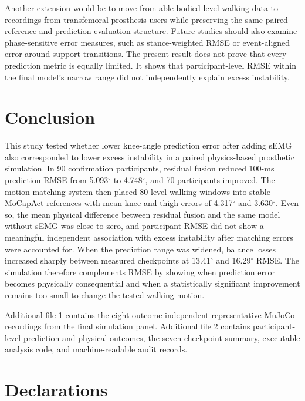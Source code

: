 \documentclass[referee,lineno,pdflatex,sn-vancouver-num]{sn-jnl}
\begin{document}
Another extension would be to move from able-bodied level-walking data to recordings from transfemoral prosthesis users while preserving the same paired reference and prediction evaluation structure. Future studies should also examine phase-sensitive error measures, such as stance-weighted RMSE or event-aligned error around support transitions. The present result does not prove that every prediction metric is equally limited. It shows that participant-level RMSE within the final model's narrow range did not independently explain excess instability.

\section{Conclusion}\label{sec:conclusion}

This study tested whether lower knee-angle prediction error after adding sEMG also corresponded to lower excess instability in a paired physics-based prosthetic simulation. In 90 confirmation participants, residual fusion reduced 100-ms prediction RMSE from 5.093$^{\circ}$ to 4.748$^{\circ}$, and 70 participants improved. The motion-matching system then placed 80 level-walking windows into stable MoCapAct references with mean knee and thigh errors of 4.317$^{\circ}$ and 3.630$^{\circ}$. Even so, the mean physical difference between residual fusion and the same model without sEMG was close to zero, and participant RMSE did not show a meaningful independent association with excess instability after matching errors were accounted for. When the prediction range was widened, balance losses increased sharply between measured checkpoints at 13.41$^{\circ}$ and 16.29$^{\circ}$ RMSE. The simulation therefore complements RMSE by showing when prediction error becomes physically consequential and when a statistically significant improvement remains too small to change the tested walking motion.

\backmatter


Additional file 1 contains the eight outcome-independent representative MuJoCo recordings from the final simulation panel. Additional file 2 contains participant-level prediction and physical outcomes, the seven-checkpoint summary, executable analysis code, and machine-readable audit records.

\section*{Declarations}
\end{document}
